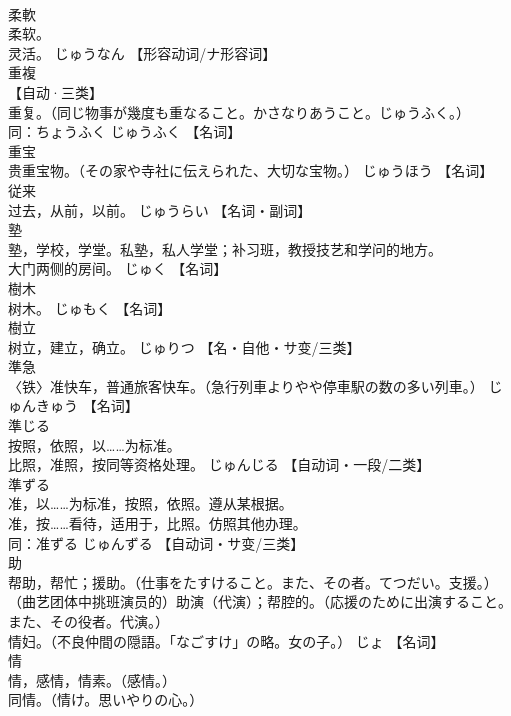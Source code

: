 \documentclass[8pt]{extreport}
\begin{document}
\begin{CJK}{UTF8}{min}
\\	柔軟	
\\	柔软。 
\\	灵活。	じゅうなん		【形容动词/ナ形容词】
\\	重複	
\\	【自动·三类】 
\\	重复。（同じ物事が幾度も重なること。かさなりあうこと。じゅうふく。） 
\\	同：ちょうふく	じゅうふく		【名词】
\\	重宝	
\\	贵重宝物。（その家や寺社に伝えられた、大切な宝物。）	じゅうほう		【名词】
\\	従来	
\\	过去，从前，以前。	じゅうらい		【名词・副词】
\\	塾	
\\	塾，学校，学堂。私塾，私人学堂；补习班，教授技艺和学问的地方。 
\\	大门两侧的房间。	じゅく		【名词】
\\	樹木	
\\	树木。	じゅもく		【名词】
\\	樹立	
\\	树立，建立，确立。	じゅりつ		【名・自他・サ变/三类】
\\	準急	
\\	〈铁〉准快车，普通旅客快车。（急行列車よりやや停車駅の数の多い列車。）	じゅんきゅう		【名词】
\\	準じる	
\\	按照，依照，以……为标准。 
\\	比照，准照，按同等资格处理。	じゅんじる		【自动词・一段/二类】
\\	準ずる	
\\	准，以……为标准，按照，依照。遵从某根据。 
\\	准，按……看待，适用于，比照。仿照其他办理。 
\\	同：准ずる	じゅんずる		【自动词・サ变/三类】
\\	助	
\\	帮助，帮忙；援助。（仕事をたすけること。また、その者。てつだい。支援。） 
\\	（曲艺团体中挑班演员的）助演（代演）；帮腔的。（応援のために出演すること。また、その役者。代演。） 
\\	情妇。（不良仲間の隠語。「なごすけ」の略。女の子。）	じょ		【名词】
\\	情	
\\	情，感情，情素。（感情。） 
\\	同情。（情け。思いやりの心。） 

\end{CJK}
\end{document}
